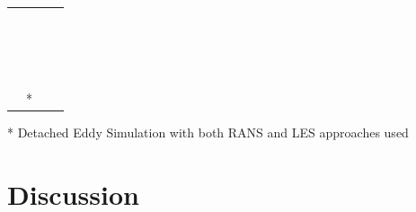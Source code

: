 \documentclass[a4paper,12pt]{elsarticle}
\begin{document}
\begin{center}
\begin{longtable}{|m{3cm}|m{4.3cm}|m{4.4cm}|m{3.2cm}|}
     & \citet{ou2022insufficient} &  &  \\
    
     & \citet{liu2020full} &  &  \\
    
     & \citet{cheng2021experimental} &  &  \\
    
     & \citet{wang2022evaluation} &  &  \\
    
     & \citet{liu2023estimating} &  &  \\
    
     & \citet{wei2023effects} &  &  \\
    
     & \citet{li2021effects} &  &  \\
    
     & \citet{cortellessa2023effectiveness} &  &  \\
    
     & \citet{srivastava2021effective} &  &  \\

     & \citet{deng2021control} &  &  \\
   
     & \citet{xu2023cfd} &  &  \\
    
     & \citet{motamedi2022cfd} &  &  \\
    
     & \citet{arpino2023cfd} &  &  \\
    
     & \citet{pan2022boundary} &  &  \\
    
     & \citet{yang2021airborne} &  &  \\
     & \citet{sen2021transmission} &  &  \\
     & \citet{feng2020influence} &  &  \\
     & \citet{fontes2020study}* &  &  \\
    \hline
\end{longtable}
* Detached Eddy Simulation with both RANS and LES approaches used
\end{center}

\section{Discussion}
\end{document}
